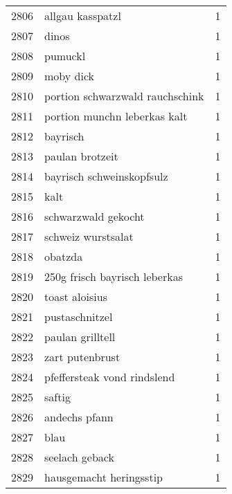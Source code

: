 \begin{tabular}{llr}
2806 &                                   allgau kasspatzl &      1 \\
2807 &                                              dinos &      1 \\
2808 &                                            pumuckl &      1 \\
2809 &                                          moby dick &      1 \\
2810 &                    portion schwarzwald rauchschink &      1 \\
2811 &                       portion munchn leberkas kalt &      1 \\
2812 &                                           bayrisch &      1 \\
2813 &                                    paulan brotzeit &      1 \\
2814 &                          bayrisch schweinskopfsulz &      1 \\
2815 &                                               kalt &      1 \\
2816 &                                schwarzwald gekocht &      1 \\
2817 &                                 schweiz wurstsalat &      1 \\
2818 &                                            obatzda &      1 \\
2819 &                      250g frisch bayrisch leberkas &      1 \\
2820 &                                     toast aloisius &      1 \\
2821 &                                     pustaschnitzel &      1 \\
2822 &                                   paulan grilltell &      1 \\
2823 &                                    zart putenbrust &      1 \\
2824 &                        pfeffersteak vond rindslend &      1 \\
2825 &                                             saftig &      1 \\
2826 &                                      andechs pfann &      1 \\
2827 &                                               blau &      1 \\
2828 &                                     seelach geback &      1 \\
2829 &                            hausgemacht heringsstip &      1 \\

\end{tabular}
